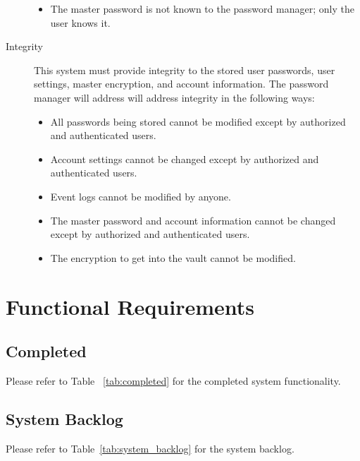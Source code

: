 \documentclass{article}
\begin{document}
\begin{description}
\begin{itemize}
    \item The master password is not known to the password manager; only the user knows it.
  \end{itemize}
  \item[Integrity] This system must provide integrity to the stored user passwords, user settings, master encryption, and account information. The password manager will address will address integrity in the following ways:
    \begin{itemize}
      \item All passwords being stored cannot be modified except by authorized and authenticated users.
      \item Account settings cannot be changed except by authorized and authenticated users.
      \item Event logs cannot be modified by anyone.
      \item The master password and account information cannot be changed except by authorized and authenticated users.
      \item The encryption to get into the vault cannot be modified.
    \end{itemize}
\end{description}

\section{Functional Requirements}
\label{sec:functional_requirements}

\subsection{Completed}
\label{sub:completed}
Please refer to Table ~\ref{tab:completed} for the completed system functionality.

\subsection{System Backlog}
\label{sub:system_backlog}
Please refer to Table~\ref{tab:system_backlog} for the system backlog.
\end{document}
